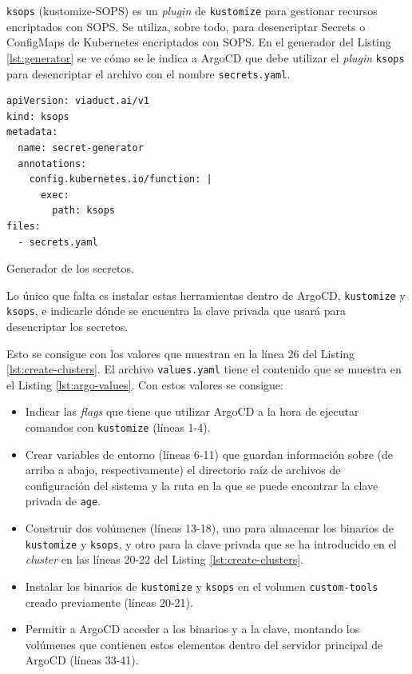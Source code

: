 \begin{itemize}
    \texttt{ksops} (kustomize-SOPS) es un \textit{plugin} de \texttt{kustomize} para gestionar recursos encriptados con SOPS. Se utiliza, sobre todo, para desencriptar Secrets o ConfigMaps de Kubernetes encriptados con SOPS. En el generador del Listing \ref{lst:generator} se ve cómo se le indica a ArgoCD que debe utilizar el \textit{plugin}  \texttt{ksops} para desencriptar el archivo con el nombre \texttt{secrets.yaml}.

\begin{listing}[!ht]
  \begin{verbatim}
apiVersion: viaduct.ai/v1
kind: ksops
metadata:
  name: secret-generator
  annotations:
    config.kubernetes.io/function: |
      exec:
        path: ksops
files:
  - secrets.yaml
\end{verbatim}
\caption{Generador de los secretos.}
\label{lst:generator}
\end{listing}

\end{itemize}

Lo único que falta es instalar estas herramientas dentro de ArgoCD, \texttt{kustomize} y \texttt{ksops}, e indicarle dónde se encuentra la clave privada que usará para desencriptar los secretos.

Esto se consigue con los valores que muestran en la línea 26 del Listing \ref{lst:create-clusters}. El archivo \texttt{values.yaml} tiene el contenido que se muestra en el Listing \ref{lst:argo-values}. Con estos valores se consigue:

\begin{itemize}
  \item Indicar las \textit{flags} que tiene que utilizar ArgoCD a la hora de ejecutar comandos con \texttt{kustomize} (líneas 1-4).
  \item Crear variables de entorno (líneas 6-11) que guardan información sobre (de arriba a abajo, respectivamente) el directorio raíz de archivos de configuración del sistema y la ruta en la que se puede encontrar la clave privada de \texttt{age}.
  \item Construir dos volúmenes (líneas 13-18), uno para almacenar los binarios de \texttt{kustomize} y \texttt{ksops}, y otro para la clave privada que se ha introducido en el \textit{cluster} en las líneas 20-22 del Listing \ref{lst:create-clusters}.
  \item Instalar los binarios de \texttt{kustomize} y \texttt{ksops} en el volumen \texttt{custom-tools} creado previamente (líneas 20-21).
  \item Permitir a ArgoCD acceder a los binarios y a la clave, montando los volúmenes que contienen estos elementos dentro del servidor principal de ArgoCD (líneas 33-41).
\end{itemize}

